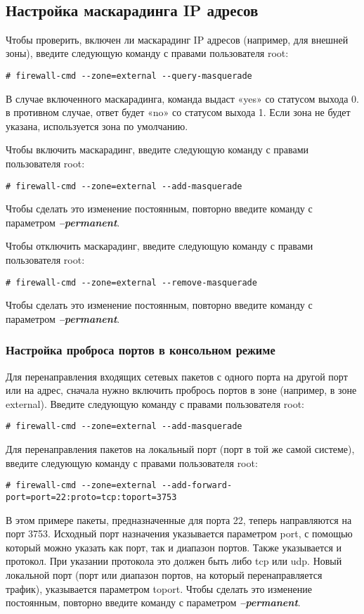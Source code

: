 \documentclass[a4paper,10pt,twoside]{article}
\begin{document}
⁠

\subsection{Настройка маскарадинга IP адресов}
Чтобы проверить, включен ли маскарадинг IP адресов (например, для внешней зоны), введите следующую команду с правами пользователя root: 
\begin{verbatim}
# firewall-cmd --zone=external --query-masquerade
\end{verbatim} 
В случае включенного маскарадинга, команда выдаст «yes» со статусом выхода 0. в противном случае, ответ будет «no» со статусом выхода 1. Если зона не будет указана, используется зона по умолчанию.

Чтобы включить маскарадинг, введите следующую команду с правами пользователя root: 
\begin{verbatim}
# firewall-cmd --zone=external --add-masquerade
\end{verbatim} 
Чтобы сделать это изменение постоянным, повторно введите команду с параметром \textit{\textbf{--permanent}}. 

Чтобы отключить маскарадинг, введите следующую команду с правами пользователя root: 
\begin{verbatim}
# firewall-cmd --zone=external --remove-masquerade
\end{verbatim} 
Чтобы сделать это изменение постоянным, повторно введите команду с параметром \textit{\textbf{--permanent}}. 


\subsubsection{Настройка проброса портов в консольном режиме}
Для перенаправления входящих сетевых пакетов с одного порта на другой порт или на адрес, сначала нужно включить пробрось портов в зоне (например, в зоне external). Введите следующую команду с правами пользователя root: 
\begin{verbatim}
# firewall-cmd --zone=external --add-masquerade
\end{verbatim} 

Для перенаправления пакетов на локальный порт (порт в той же самой системе), введите следующую команду с правами пользователя root: 
\begin{verbatim}
# firewall-cmd --zone=external --add-forward-port=port=22:proto=tcp:toport=3753
\end{verbatim} 

В этом примере пакеты, предназначенные для порта 22, теперь направляются на порт 3753. Исходный порт назначения указывается параметром port, с помощью который можно указать как порт, так и диапазон портов. Также указывается и протокол. При указании протокола это должен быть либо tcp или udp. Новый локальной порт (порт или диапазон портов, на который перенаправляется трафик), указывается параметром toport. Чтобы сделать это изменение постоянным, повторно введите команду с параметром \textit{\textbf{--permanent}}. 
\end{document}
